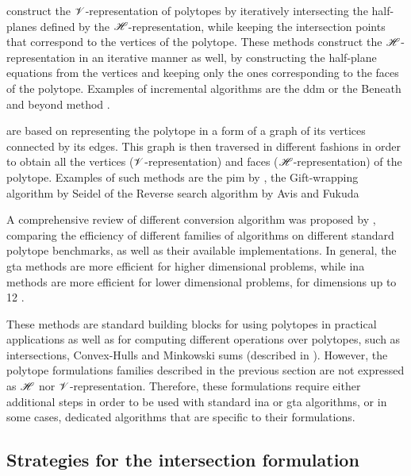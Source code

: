  construct the $\mathscr{V}$-representation of polytopes by iteratively intersecting the half-planes defined by the $\mathscr{H}$-representation, while keeping the intersection points that correspond to the vertices of the polytope. These methods construct the $\mathscr{H}$-representation in an iterative manner as well, by constructing the half-plane equations from the vertices and keeping only the ones corresponding to the faces of the polytope. Examples of incremental algorithms are the \gls{ddm} \cite{MotzkinR1953dd,fukuda_dd} or the Beneath and beyond method \cite{Seidel_1981}.

 are based on representing the polytope in a form of a graph of its vertices connected by its edges. This graph is then traversed in different fashions in order to obtain all the vertices ($\mathscr{V}$-representation) and faces ($\mathscr{H}$-representation) of the polytope. Examples of such methods are the \gls{pim} by \citet{bremner_fukuda_marzetta_1998}, the Gift-wrapping algorithm by Seidel \cite{Seidel1987outputsensitive} of the Reverse search algorithm by Avis and Fukuda \cite{avis_pivoting_nodate}

A comprehensive review of different conversion algorithm was proposed by \citet{avis1997how}, comparing the efficiency of different families of algorithms on different standard polytope benchmarks, as well as their available implementations. In general, the \gls{gta} methods are more efficient for higher dimensional problems, while \gls{ina} methods are more efficient for lower dimensional problems, for dimensions up to 12 \cite[Chapter 8.3]{fukuda2016lecture}.

These methods are standard building blocks for using polytopes in practical applications as well as for computing different operations over polytopes, such as intersections, Convex-Hulls and Minkowski sums (described in ). However, the polytope formulations families described in the previous section are not expressed as $\mathscr{H}$ nor $\mathscr{V}$-representation. Therefore, these formulations require either additional steps in order to be used with standard \gls{ina} or \gls{gta} algorithms, or in some cases, dedicated algorithms that are specific to their formulations. 


\subsection{Strategies for the intersection formulation}
\label{ch:intersection_algos}

